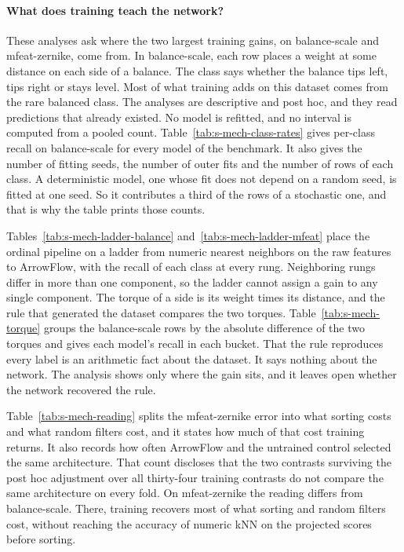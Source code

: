 \paragraph{What does training teach the network?} These analyses ask where the two largest training gains, on balance-scale and mfeat-zernike, come from. In balance-scale, each row places a weight at some distance on each side of a balance. The class says whether the balance tips left, tips right or stays level. Most of what training adds on this dataset comes from the rare balanced class. The analyses are descriptive and post hoc, and they read predictions that already existed. No model is refitted, and no interval is computed from a pooled count. Table~\ref{tab:s-mech-class-rates} gives per-class recall on balance-scale for every model of the benchmark. It also gives the number of fitting seeds, the number of outer fits and the number of rows of each class. A deterministic model, one whose fit does not depend on a random seed, is fitted at one seed. So it contributes a third of the rows of a stochastic one, and that is why the table prints those counts.

Tables~\ref{tab:s-mech-ladder-balance} and~\ref{tab:s-mech-ladder-mfeat} place the ordinal pipeline on a ladder from numeric nearest neighbors on the raw features to ArrowFlow, with the recall of each class at every rung. Neighboring rungs differ in more than one component, so the ladder cannot assign a gain to any single component. The torque of a side is its weight times its distance, and the rule that generated the dataset compares the two torques. Table~\ref{tab:s-mech-torque} groups the balance-scale rows by the absolute difference of the two torques and gives each model's recall in each bucket. That the rule reproduces every label is an arithmetic fact about the dataset. It says nothing about the network. The analysis shows only where the gain sits, and it leaves open whether the network recovered the rule.

Table~\ref{tab:s-mech-reading} splits the mfeat-zernike error into what sorting costs and what random filters cost, and it states how much of that cost training returns. It also records how often ArrowFlow and the untrained control selected the same architecture. That count discloses that the two contrasts surviving the post hoc adjustment over all thirty-four training contrasts do not compare the same architecture on every fold. On mfeat-zernike the reading differs from balance-scale. There, training recovers most of what sorting and random filters cost, without reaching the accuracy of numeric kNN on the projected scores before sorting.

